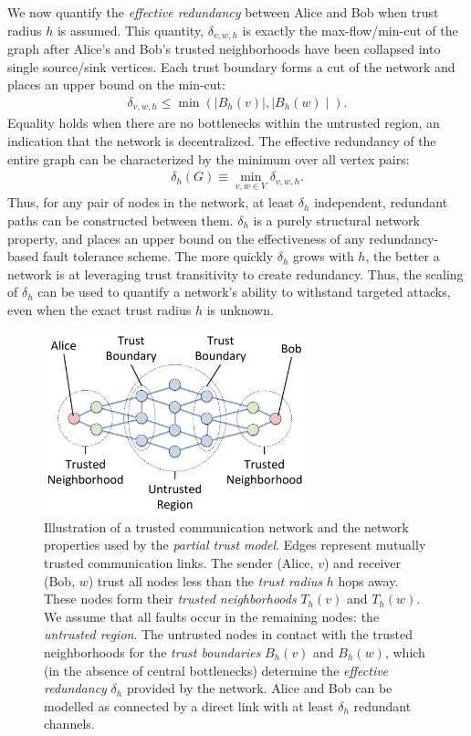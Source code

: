 \documentclass{sig-alternate-05-2015}
\newcommand{\beq}{\begin{eqnarray}}
\newcommand{\eeq}{\end{eqnarray}}
\begin{document}
We now quantify the {\em effective redundancy} between Alice and Bob
when trust radius $h$ is assumed.
This quantity, $\delta_{v,w,h}$ is exactly the max-flow/min-cut of
the graph after Alice's and Bob's trusted neighborhoods have been
collapsed into single source/sink vertices.
Each trust boundary forms a cut of the network and places an upper bound on the
min-cut:
\beq
\delta_{v,w,h} \leq \min\left( \mid B_h(v) \mid, \mid B_h(w) \mid \right).
\eeq
Equality holds when there are no bottlenecks within the untrusted region,
an indication that the network is decentralized.
The effective redundancy of the entire graph can be characterized by the minimum over
all vertex pairs:
\beq
\delta_h(G) \equiv \min_{v,w \in V} \delta_{v,w,h}.
\eeq
Thus, for any pair of nodes in the network, at least $\delta_h$ independent,
redundant paths can be constructed between them.
$\delta_h$ is a purely structural network property,
and places an upper bound on the effectiveness of any
redundancy-based fault tolerance scheme.
The more quickly $\delta_h$ grows with $h$,
the better a network is at leveraging trust transitivity to create redundancy.
Thus, the scaling of $\delta_h$ can be used to quantify a network's ability
to withstand targeted attacks,
even when the exact trust radius $h$ is unknown.

\begin{figure}
\centerline{\includegraphics[width=3in,height=2.08in]{fig-partial-trust}}
\caption{
Illustration of a trusted communication network and the network properties
used by the {\em partial trust model}.
Edges represent mutually trusted communication links.
The sender (Alice, $v$) and receiver (Bob, $w$) trust all nodes
less than the {\em trust radius} $h$ hops away.
These nodes form their {\em trusted neighborhoods} $T_h(v)$ and $T_h(w)$.
We assume that all faults occur in the remaining nodes: the
{\em untrusted region}.
The untrusted nodes in contact with the trusted neighborhoods for the
{\em trust boundaries} $B_h(v)$ and $B_h(w)$,
which (in the absence of central bottlenecks) determine the
{\em effective redundancy} $\delta_h$ provided by the network.
Alice and Bob can be modelled as connected by a direct link with
at least $\delta_h$ redundant channels.
}
\label{fig:trust-source}
\end{figure}
\end{document}
